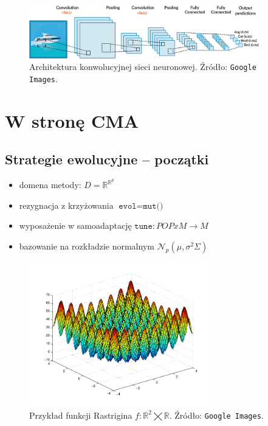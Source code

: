 \documentclass[slidescentered]{beamer}
\begin{document}
\begin{frame}
\begin{figure}[H]
	\centering
	\includegraphics[width=0.9\textwidth, height=0.7\textheight]{./cnn-2.png}
	\caption{Architektura konwolucyjnej sieci neuronowej. Źródło: \texttt{Google Images}.}
\end{figure}
\end{frame}




\section{W stronę CMA}
\subsection{Strategie ewolucyjne -- początki}

\begin{frame}
	\begin{itemize}
	\item domena metody: $ D = \mathbb{R}^{\mathbb{R}^{p}}$ 
	\pause \item rezygnacja z krzyżowania $\texttt{evol} = \texttt{mut()}$
	\pause 	\item wyposażenie w samoadaptację $\texttt{tune}\colon POP x M \rightarrow M$ 
	\pause	\item bazowanie na rozkładzie normalnym $\mathcal{N}_p(\mu, \sigma^{2}\Sigma)$
	\end{itemize}
\end{frame}


\begin{frame}
	\begin{figure}[H]
		\centering
		\includegraphics[width=0.7\textwidth, height=0.7\textheight]{./func-example.png}
		\caption{Przykład funkcji Rastrigina $f\colon \mathbb{R}^{2} \bigtimes \mathbb{R}$. Źródło: \texttt{Google Images}.}
	\end{figure}
\end{frame}
\end{document}
